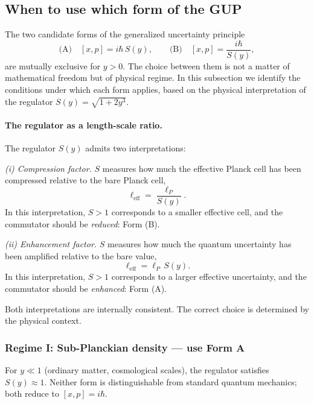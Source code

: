 \documentclass[12pt,oneside,openany]{book}
\begin{document}
\subsection{When to use which form of the GUP}
\label{sec:when-GUP}

The two candidate forms of the generalized uncertainty principle
\begin{equation}
\text{(A)}\quad [x,p]=i\hbar\,S(y),
\qquad
\text{(B)}\quad [x,p]=\frac{i\hbar}{S(y)},
\label{eq:AB}
\end{equation}
are mutually exclusive for $y>0$. The choice between them is not
a matter of mathematical freedom but of physical regime. In this
subsection we identify the conditions under which each form
applies, based on the physical interpretation of the regulator
$S(y)=\sqrt{1+2y^{3}}$.

\paragraph{The regulator as a length-scale ratio.}
The regulator $S(y)$ admits two interpretations:

\emph{(i) Compression factor.} $S$ measures how much the
effective Planck cell has been compressed relative to the bare
Planck cell,
\begin{equation}
\ell_{\text{eff}}=\frac{\ell_{P}}{S(y)}.
\label{eq:l-eff-compression}
\end{equation}
In this interpretation, $S>1$ corresponds to a smaller effective
cell, and the commutator should be \emph{reduced}: Form (B).

\emph{(ii) Enhancement factor.} $S$ measures how much the
quantum uncertainty has been amplified relative to the bare
value,
\begin{equation}
\ell_{\text{eff}}=\ell_{P}\,S(y).
\label{eq:l-eff-enhancement}
\end{equation}
In this interpretation, $S>1$ corresponds to a larger effective
uncertainty, and the commutator should be \emph{enhanced}: Form
(A).

Both interpretations are internally consistent. The correct
choice is determined by the physical context.

\subsubsection{Regime I: Sub-Planckian density --- use Form A}

For $y\ll 1$ (ordinary matter, cosmological scales), the
regulator satisfies $S(y)\approx 1$. Neither form is
distinguishable from standard quantum mechanics; both reduce to
$[x,p]=i\hbar$.
\end{document}
